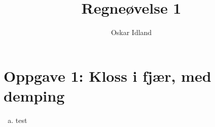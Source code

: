 \documentclass{article}
\author{Oskar Idland}
\title{Regneøvelse 1}
\date{}
\begin{document}
\maketitle
\newpage

\section{Oppgave 1: Kloss i fjær, med demping}
\begin{enumerate}[a)]
\item 
test

\end{enumerate}
\end{document}
